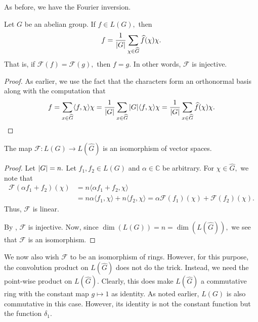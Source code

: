 \documentclass[12pt]{article}	%
\begin{document}
As before, we have the Fourier inversion. 

\begin{thm} \label{thm:fourierinv}
    Let $G$ be an abelian group. If $f \in L(G),$ then
    \begin{equation*}
        f = \frac{1}{{\left\lvert G \right\lvert}}\sum_{\chi \in \widehat{G}} \widehat{f}(\chi)\chi.
    \end{equation*}
    That is, if $\mathcal{F}(f) = \mathcal{F}(g),$ then $f = g.$ In other words, $\mathcal{F}$ is injective.
\end{thm}
\begin{proof}
    As earlier, we use the fact that the characters form an orthonormal basis along with the computation that
    \begin{equation*}
        f = \sum_{x \in \widehat{G}}\langle f, \chi\rangle\chi = \frac{1}{{\left\lvert G \right\lvert}}\sum_{x \in \widehat{G}}{\left\lvert G \right\lvert}\langle f, \chi\rangle\chi = \frac{1}{{\left\lvert G \right\lvert}}\sum_{x \in \widehat{G}} \widehat{f}(\chi)\chi. \qedhere
    \end{equation*}
\end{proof}

\begin{prop} \label{prop:fourierisovspace}
    The map $\mathcal{F} : L(G) \to L(\widehat{G})$ is an isomorphism of vector spaces.
\end{prop}
\begin{proof}
    Let ${\left\lvert G \right\lvert} = n.$ Let $f_1, f_2 \in L(G)$ and $\alpha \in \mathbb{C}$ be arbitrary. For $\chi \in \widehat{G},$ we note that
    \begin{align*}
        \mathcal{F}(\alpha f_1 + f_2)(\chi) &= n\langle \alpha f_1 + f_2, \chi\rangle \\
        &= n\alpha\langle f_1, \chi\rangle + n\langle f_2, \chi\rangle = \alpha\mathcal{F}(f_1)(\chi) + \mathcal{F}(f_2)(\chi).
    \end{align*}
    Thus, $\mathcal{F}$ is linear.
    
    By , $\mathcal{F}$ is injective. Now, since $\dim(L(G)) = n = \dim(L(\widehat{G})),$ we see that $\mathcal{F}$ is an isomorphism.
\end{proof}

We now also wish $\mathcal{F}$ to be an isomorphism of rings. However, for this purpose, the convolution product on $L(\widehat{G})$ does not do the trick. Instead, we need the point-wise product on $L(\widehat{G}).$ Clearly, this does make $L(\widehat{G})$ a commutative ring with the constant map $g \mapsto 1$ as identity. As noted earlier, $L(G)$ is also commutative in this case. However, its identity is not the constant function but the function $\delta_1.$
\end{document}

